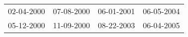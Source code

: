 \begin{supertabular}{llll}
 02-04-2000 &  07-08-2000 &  06-01-2001 &  06-05-2004 \\
 05-12-2000 &  11-09-2000 &  08-22-2003 &  06-04-2005 \\
\end{supertabular}
